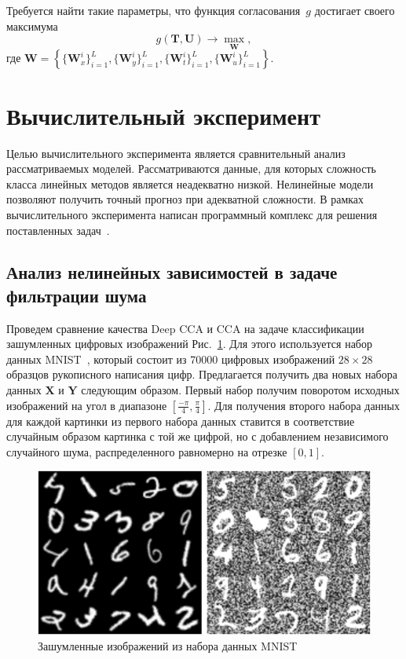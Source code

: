 \documentclass[12pt]{article}
\newcommand{\bY}{\mathbf{Y}}
\newcommand{\bX}{\mathbf{X}}
\newcommand{\bT}{\mathbf{T}}
\newcommand{\bU}{\mathbf{U}}
\newcommand{\bW}{\mathbf{W}}
\begin{document}
	Требуется найти такие параметры, что функция согласования~$g$ достигает своего максимума
	\begin{equation}
		g(\bT, \bU) \rightarrow \max_{\bW},
		\label{concordance}
	\end{equation}
	где $\bW = \left\{\{\bW_x^i\}_{i=1}^L, \{\bW_y^i\}_{i=1}^L, \{\bW_t^i\}_{i=1}^L, \{\bW_u^i\}_{i=1}^L\right\}$.
	
	\section{Вычислительный эксперимент}
	Целью вычислительного эксперимента является сравнительный анализ рассматриваемых моделей.
	Рассматриваются данные, для которых сложность класса линейных методов является неадекватно низкой.
	Нелинейные модели позволяют получить точный прогноз при адекватной сложности.
	В рамках вычислительного эксперимента написан программный комплекс для решения поставленных задач~\cite{source_code}.
	
	\subsection{Анализ нелинейных зависимостей в задаче фильтрации шума}
	
	Проведем сравнение качества Deep CCA и CCA на задаче классификации зашумленных цифровых изображений Рис.~\ref{fgr:1}. Для этого используется набор данных MNIST~\cite{MNIST}, который состоит из 70000 цифровых изображений $28 \times 28$ образцов рукописного написания цифр. Предлагается получить два новых набора данных $\bX$ и $\bY$ следующим образом. Первый набор получим поворотом исходных изображений на угол в диапазоне $[\frac{-\pi}{4}, \frac{\pi}{4}]$. Для получения второго набора данных для каждой картинки из первого набора данных ставится в соответствие случайным образом картинка с той же цифрой, но с добавлением независимого случайного шума, распределенного равномерно на отрезке $[0,1]$.
	
	\begin{figure}[h!]
		\begin{center}
			\includegraphics[width=\linewidth]{figures/noisy_mnist}
		\end{center}
		\caption{Зашумленные изображений из набора данных MNIST}
		\label{fgr:1}
	\end{figure}
	
\end{document}
